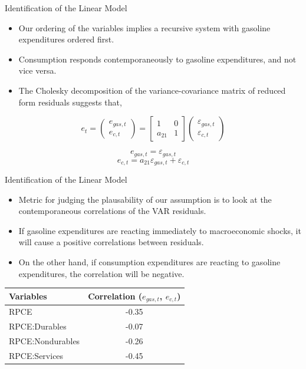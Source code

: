 \documentclass[
  10pt,
  ignorenonframetext,
]{beamer}
\begin{document}
\begin{frame}{Identification of the Linear Model}
\protect\hypertarget{identification-of-the-linear-model}{}

\begin{itemize}
\item
  Our ordering of the variables implies a recursive system with gasoline
  expenditures ordered first.
\item
  Consumption responds contemporaneously to gasoline expenditures, and
  not vice versa.
\item
  The Cholesky decomposition of the variance-covariance matrix of
  reduced form residuals suggests that,
\end{itemize}

\[e_t=
\begin{pmatrix}
e_{gas,t}\\ 
e_{c,t}
\end{pmatrix}=
\begin{bmatrix}
1 & 0\\ 
a_{21} & 1 
\end{bmatrix}
\begin{pmatrix}
\varepsilon_{gas,t}\\ 
\varepsilon_{c,t}
\end{pmatrix}\]

\[e_{gas,t}=\varepsilon_{gas,t}\]
\[e_{c,t}=a_{21}\varepsilon_{gas,t}+\varepsilon_{c,t}\]

\end{frame}

\begin{frame}{Identification of the Linear Model}
\protect\hypertarget{identification-of-the-linear-model-1}{}

\begin{itemize}
\item
  Metric for judging the plausability of our assumption is to look at
  the contemporaneous correlations of the VAR residuals.
\item
  If gasoline expenditures are reacting immediately to macroeconomic
  shocks, it will cause a positive correlations between residuals.
\item
  On the other hand, if consumption expenditures are reacting to
  gasoline expenditures, the correlation will be negative.
\end{itemize}

\begin{longtable}[]{@{}lc@{}}
\toprule
Variables & Correlation (\(e_{gas,t}\), \(e_{c,t}\))\tabularnewline
\midrule
\endhead
RPCE & -0.35\tabularnewline
RPCE:Durables & -0.07\tabularnewline
RPCE:Nondurables & -0.26\tabularnewline
RPCE:Services & -0.45\tabularnewline
\bottomrule
\end{longtable}

\end{frame}
\end{document}
